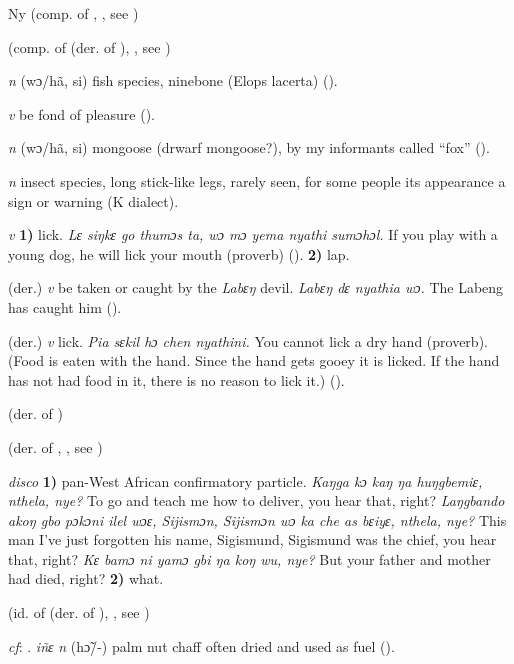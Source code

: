 \begin{letter}{Ny}
 (comp. of , , see ) 

 (comp. of  (der. of ), , see ) 

 \textit{n} (wɔ/hã, si) fish species, ninebone (Elops lacerta) (\citealt{Pichl1967}). 

 \textit{v} be fond of pleasure (\citealt{Pichl1967}). 

 \textit{n} (wɔ/hã, si) mongoose (drwarf mongoose?), by my informants called “fox” (\citealt{Pichl1967}). 

 \textit{n} insect species, long stick-like legs, rarely seen, for some people its appearance a sign or warning (K dialect). 

 \textit{v} \textbf{1)} lick. \textit{Lɛ siŋkɛ go thumɔs ta, wɔ mɔ yema nyathi sumɔhɔl.} If you play with a young dog, he will lick your mouth (proverb) (\citealt{Pichl1967}). \textbf{2)} lap.

 (der.) \textit{v} be taken or caught by the \textit{Labɛŋ} devil. \textit{Labɛŋ dɛ nyathia wɔ.} The Labeng has caught him (\citealt{Pichl1967}).

 (der.) \textit{v} lick. \textit{Pia sɛkil hɔ chen nyathini.} You cannot lick a dry hand (proverb). (Food is eaten with the hand. Since the hand gets gooey it is licked. If the hand has not had food in it, there is no reason to lick it.) (\citealt{TISLL1979}). 

 (der. of ) 

 (der. of , , see ) 

 \textit{disco} \textbf{1)} pan-West African confirmatory particle. \textit{Kaŋga kɔ kaŋ ŋa huŋgbemiɛ, nthela, nye?} To go and teach me how to deliver, you hear that, right? \textit{Laŋgbando akoŋ gbo pɔkɔni ilel wɔɛ, Sijismɔn, Sijismɔn wɔ ka che as bɛiyɛ, nthela, nye?} This man I've just forgotten his name, Sigismund, Sigismund was the chief, you hear that, right? \textit{Kɛ bamɔ ni yamɔ gbi ŋa koŋ wu, nye?} But your father and mother had died, right? \textbf{2)} what.

 (id. of  (der. of ), , see ) 

 \textit{cf}: . \textit{iñɛ} \textit{n} (hɔ̃/-) palm nut chaff often dried and used as fuel (\citealt{Pichl1967}). 


\end{letter}
